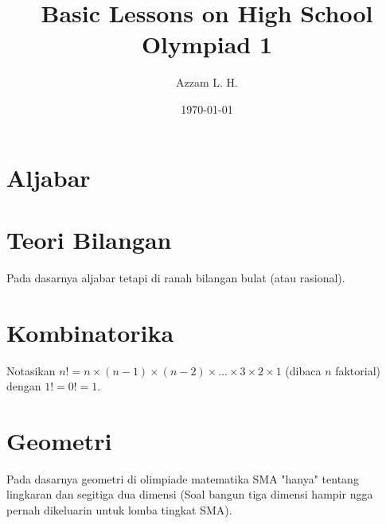 \title{Basic Lessons on High School Olympiad 1} %
\date{\today}
\author{Azzam L. H.}
\maketitle
\renewcommand*\contentsname{Daftar Isi}
\tableofcontents

\newpage
\section{Aljabar}




\newpage
\section{Teori Bilangan}
Pada dasarnya aljabar tetapi di ranah bilangan bulat (atau rasional).




        
\newpage    
\section{Kombinatorika}

Notasikan $n!=n \times (n-1) \times (n-2) \times \dots \times 3 \times 2 \times 1$ (dibaca $n$ faktorial) dengan $1!=0!=1$.






\newpage
\section{Geometri}
Pada dasarnya geometri di olimpiade matematika SMA "hanya" tentang lingkaran dan segitiga dua dimensi (Soal bangun tiga dimensi hampir ngga pernah dikeluarin untuk lomba tingkat SMA).
    






